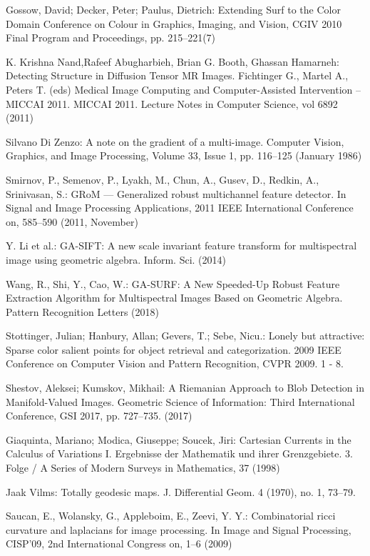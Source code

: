 \documentclass[twocolumn]{svjour3}          %
\begin{document}
\begin{thebibliography}{16}
Gossow, David; Decker, Peter; Paulus, Dietrich:
Extending Surf to the Color Domain
Conference on Colour in Graphics, Imaging, and Vision, CGIV 2010 Final Program and Proceedings, pp. 215--221(7)

K. Krishna Nand,Rafeef Abugharbieh, Brian G. Booth, Ghassan Hamarneh:
Detecting Structure in Diffusion Tensor MR Images.
Fichtinger G., Martel A., Peters T. (eds) Medical Image Computing and Computer-Assisted Intervention – MICCAI 2011. MICCAI 2011. Lecture Notes in Computer Science, vol 6892 (2011)

Silvano Di Zenzo:
A note on the gradient of a multi-image.
Computer Vision, Graphics, and Image Processing, Volume 33, Issue 1, pp. 116--125 (January 1986)


Smirnov, P., Semenov, P., Lyakh, M., Chun, A., Gusev, D., Redkin, A., Srinivasan, S.:
GRoM --- Generalized robust multichannel feature detector. 
In Signal and Image Processing Applications, 2011 IEEE International Conference on, 585--590 (2011, November)

Y. Li et al.: 
GA-SIFT: A new scale invariant feature transform for multispectral image using geometric algebra.
Inform. Sci. (2014)

Wang, R., Shi, Y., Cao, W.:
GA-SURF: A New Speeded-Up Robust Feature Extraction Algorithm for Multispectral Images Based on Geometric Algebra. 
Pattern Recognition Letters (2018)

Stottinger, Julian; Hanbury, Allan; Gevers, T.; Sebe, Nicu.: 
Lonely but attractive: Sparse color salient points for object retrieval and categorization. 
2009 IEEE Conference on Computer Vision and Pattern Recognition, CVPR 2009. 1 - 8. 

Shestov, Aleksei; Kumskov, Mikhail: 
A Riemanian Approach to Blob Detection in Manifold-Valued Images. 
Geometric Science of Information: Third International Conference, GSI 2017, pp. 727--735. (2017)

Giaquinta, Mariano; Modica, Giuseppe; Soucek, Jiri:
Cartesian Currents in the Calculus of Variations I.
Ergebnisse der Mathematik und ihrer Grenzgebiete. 3. Folge / A Series of Modern Surveys in Mathematics, 37 (1998)

Jaak Vilms:
Totally geodesic maps.
J. Differential Geom. 4 (1970), no. 1, 73--79.

Saucan, E., Wolansky, G., Appleboim, E., Zeevi, Y. Y.:
Combinatorial ricci curvature and laplacians for image processing. 
In Image and Signal Processing, CISP'09, 2nd International Congress on, 1--6 (2009)


\end{thebibliography}
\end{document}
